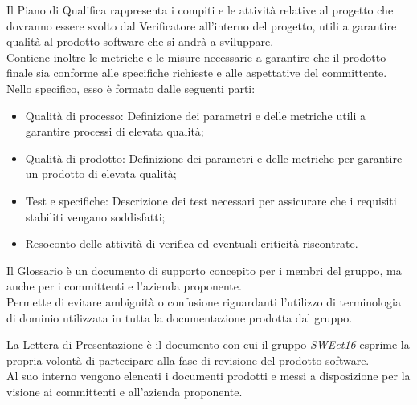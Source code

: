 
    Il Piano di Qualifica rappresenta i compiti e le attività relative al progetto che dovranno essere svolto dal Verificatore all'interno del progetto,
    utili a garantire qualità al prodotto software che si andrà a sviluppare. \\
    Contiene inoltre le metriche e le misure necessarie a garantire che il prodotto finale sia conforme alle specifiche richieste e alle aspettative del committente. \\

    Nello specifico, esso è formato dalle seguenti parti:
    \begin{itemize}
        \item Qualità di processo: Definizione dei parametri e delle metriche utili a garantire processi di elevata qualità;
        \item Qualità di prodotto: Definizione dei parametri e delle metriche per garantire un prodotto di elevata qualità;
        \item Test e specifiche: Descrizione dei test necessari per assicurare che i requisiti stabiliti vengano soddisfatti;
        \item Resoconto delle attività di verifica ed eventuali criticità riscontrate.
    \end{itemize}



    Il Glossario è un documento di supporto concepito per i membri del gruppo, ma anche per i committenti e l'azienda proponente. \\
    Permette di evitare ambiguità o confusione riguardanti l'utilizzo di terminologia di dominio utilizzata in tutta la documentazione prodotta dal gruppo.



    La Lettera di Presentazione è il documento con cui il gruppo \textit{SWEet16} esprime la propria volontà di partecipare alla fase di revisione del prodotto software. \\
    Al suo interno vengono elencati i documenti prodotti e messi a disposizione per la visione ai committenti e all'azienda proponente.

